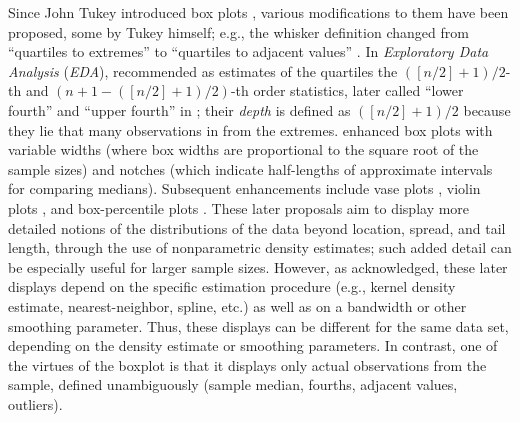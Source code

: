 \documentclass[oneside]{article}
\begin{document}
Since John Tukey introduced box plots \citep{tukey72}, various 
modifications to them have been proposed, some by Tukey himself;
e.g., the whisker definition changed from ``quartiles to extremes'' 
\citep{tukey72} to ``quartiles to adjacent values'' \citep{eda}.
In \textit{Exploratory Data Analysis} (\textit{EDA}), 
\citet{eda} recommended as estimates of the quartiles the
$([n/2] + 1)/2$-th and $(n + 1 - ([n/2] + 1)/2)$-th 
order statistics, later called ``lower fourth'' and 
``upper fourth'' in \citet{ureda}; their \textit{depth} 
is defined as $([n/2] + 1)/2$ because they lie that
many observations in from the extremes.
\citet{variations.boxplots} enhanced box plots with 
variable widths (where box widths are proportional to the square 
root of the sample sizes) and notches (which indicate half-lengths 
of approximate intervals for comparing medians). 
Subsequent enhancements include vase plots \citep{vase}, violin plots \citep{violin}, and box-percentile plots \citep{box.percentiles}.
These later proposals aim to display more detailed
notions of the distributions of the data beyond location,
spread, and tail length, through the use
of nonparametric density estimates; such added detail can be
especially useful for larger sample sizes.  However, as
\citet{vase} acknowledged, these later displays depend 
on the specific estimation procedure
(e.g., kernel density estimate, nearest-neighbor, spline, etc.)
as well as on a bandwidth or other smoothing parameter.
Thus, these displays can be different for the same data set,
depending on the density estimate or smoothing parameters.
In contrast, one of the virtues of the boxplot is that it
displays only actual observations from the sample, defined
unambiguously
(sample median, fourths, adjacent values, outliers).  
\end{document}
